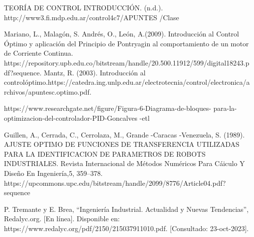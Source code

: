 \documentclass[12pt,letterpaper]{article}
\begin{document}
\begin{thebibliography}{1}

TEORÍA DE CONTROL INTRODUCCIÓN. (n.d.). http://www3.fi.mdp.edu.ar/control4c7/APUNTES /Clase%

Mariano, L., Malagón, S.
Andrés, O., León, A.(2009).
Introducción al Control Óptimo y aplicación del Principio de Pontryagin al comportamiento de un motor de Corriente Continua. 
https://repository.upb.edu.co/bitstream/handle/20.500.11912/599/digital18243.pdf?sequence.
‌
‌Mantz, R. (2003). 
Introducción al controlóptimo.https://catedra.ing.unlp.edu.ar/electrotecnia/control/electronica/archivos/apuntesc.optimo.pdf.

‌https://www.researchgate.net/figure/Figura-6-Diagrama-de-bloques-
para-la-optimizacion-del-controlador-PID-Goncalves
-etl

Guillen, A., Cerrada, C., Cerrolaza, M.,  Grande -Caracas -Venezuela, S. (1989).
AJUSTE OPTIMO DE FUNCIONES DE TRANSFERENCIA UTILIZADAS PARA LA IDENTIFICACION DE PARAMETROS DE ROBOTS INDUSTRIALES. 
Revista Internacional de Métodos Numéricos Para Cáiculo Y Diseño En Ingeniería,5, 359–378.
https://upcommons.upc.edu/bitstream/handle/2099/8776/Article04.pdf?sequence


P. Tremante y E. Brea, “Ingeniería Industrial. Actualidad y Nuevas Tendencias”, Redalyc.org. [En línea]. Disponible en: https://www.redalyc.org/pdf/2150/215037911010.pdf. [Consultado: 23-oct-2023].





\end{thebibliography}
\end{document}
